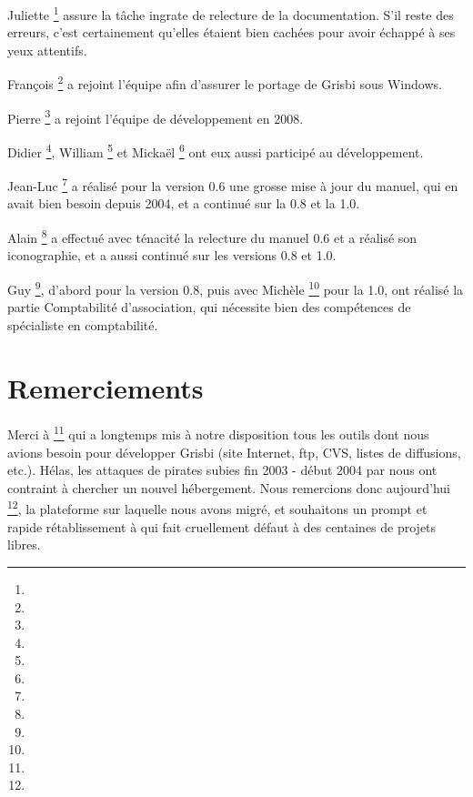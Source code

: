 {Juliette }\footnote{\urlJulietteEmail{}} assure la tâche
ingrate de relecture de la documentation. S'il reste des erreurs, c'est
certainement qu'elles étaient bien cachées pour avoir échappé à ses yeux
attentifs.

{François }\footnote{\urlFrancoisTerrotEmail{}} a rejoint l'équipe afin d'assurer le \gls{portage} de Grisbi sous Windows.

{Pierre }\footnote{\urlPierreBiavaEmail{}} a rejoint l'équipe de développement en 2008.

{Didier }\footnote{\urlDidierChevalierEmail{}},  {William }\footnote{\urlWilliamOllivierEmail{}} et {Mickaël }\footnote{\urlMickaelRemarsEmail{}} ont eux aussi participé au développement.

{Jean-Luc }\footnote{\urlJeanLucDuflotEmail{}} a réalisé pour la version 0.6 une grosse mise à jour du manuel, qui en avait bien besoin depuis 2004, et a continué sur la 0.8 et la 1.0.

{Alain }\footnote{\urlAlainLetientEmail{}} a effectué avec ténacité la relecture du manuel 0.6 et a réalisé son iconographie, et a aussi continué sur les versions 0.8 et 1.0.

{Guy }\footnote{\urlGuyLebegueEmail{}}, d'abord pour la version 0.8, puis avec {Michèle }\footnote{\urlMicheleBondilEmail{}} pour la 1.0, ont réalisé la partie Comptabilité d'association, qui nécessite bien des compétences de spécialiste en comptabilité.


\section{Remerciements\label{introduction-thanks}}


Merci à \footnote{\urlTuxFamily{}} qui a longtemps mis à notre disposition tous les outils dont nous avions besoin pour développer Grisbi
(site Internet, ftp, CVS, listes de diffusions, etc.). Hélas, les attaques
de pirates subies fin 2003 - début 2004 par  nous ont contraint à chercher un nouvel hébergement. Nous remercions donc aujourd'hui \footnote{\urlSourceForge{}}, la plateforme sur laquelle nous avons migré, et souhaitons un prompt et rapide rétablissement à  qui fait cruellement défaut à des centaines de projets libres.

